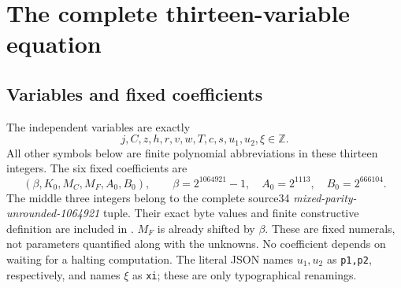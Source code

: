 \documentclass[11pt]{article}
\theoremstyle{remark}\newtheorem{remark}[theorem]{Remark}
\newcommand{\Z}{\mathbb Z}\newcommand{\Q}{\mathbb Q}\newcommand{\N}{\mathbb N}
\newcommand{\file}[1]{\path{#1}}
\begin{document}
\section{The complete thirteen-variable equation}\label{sec:equation}

\subsection{Variables and fixed coefficients}
The independent variables are exactly
\begin{equation}\label{eq:vars}
 j,C,z,h,r,v,w,T,c,s,u_1,u_2,\xi\in\Z.
\end{equation}
All other symbols below are finite polynomial abbreviations in these
thirteen integers. The six fixed coefficients are
\[
 (\beta,K_0,M_C,M_F,A_0,B_0),\qquad
 \beta=2^{1064921}-1,\quad A_0=2^{1113},\quad B_0=2^{666104}.
\]
The middle three integers belong to the complete source34
\emph{mixed-parity-unrounded-1064921} tuple. Their exact byte values and
finite constructive definition are included in \file{coefficients/}.
$M_F$ is already shifted by $\beta$. These are fixed numerals, not
parameters quantified along with the unknowns. No coefficient depends on
waiting for a halting computation.
The literal JSON names $u_1,u_2$ as \texttt{p1,p2}, respectively, and
names $\xi$ as \texttt{xi}; these are only typographical renamings.
\end{document}
